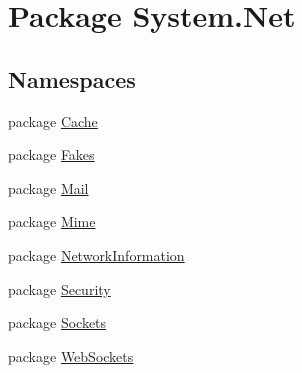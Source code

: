 \hypertarget{namespace_system_1_1_net}{\section{Package System.\-Net}
\label{namespace_system_1_1_net}
}
\subsection*{Namespaces}
\begin{DoxyCompactItemize}
\item 
package \hyperlink{namespace_system_1_1_net_1_1_cache}{Cache}
\item 
package \hyperlink{namespace_system_1_1_net_1_1_fakes}{Fakes}
\item 
package \hyperlink{namespace_system_1_1_net_1_1_mail}{Mail}
\item 
package \hyperlink{namespace_system_1_1_net_1_1_mime}{Mime}
\item 
package \hyperlink{namespace_system_1_1_net_1_1_network_information}{Network\-Information}
\item 
package \hyperlink{namespace_system_1_1_net_1_1_security}{Security}
\item 
package \hyperlink{namespace_system_1_1_net_1_1_sockets}{Sockets}
\item 
package \hyperlink{namespace_system_1_1_net_1_1_web_sockets}{Web\-Sockets}
\end{DoxyCompactItemize}
